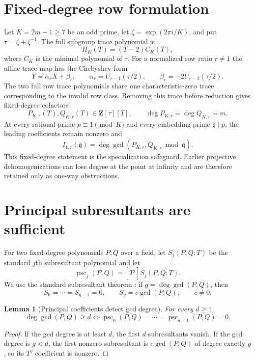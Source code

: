 \documentclass[11pt]{article}
\newtheorem{lemma}[theorem]{Lemma}
\begin{document}
\section{Fixed-degree row formulation}

Let $K=2m+1\ge7$ be an odd prime, let
$\zeta=\exp(2\pi i/K)$, and put $\tau=\zeta+\zeta^{-1}$.  The full subgroup
trace polynomial is
\[
H_K(T)=(T-2)C_K(T),
\]
where $C_K$ is the minimal polynomial of $\tau$.  For a normalized row ratio
$r\ne1$ the affine trace map has the Chebyshev form
\[
Y=\alpha_rX+\beta_r,
\qquad
\alpha_r=U_{r-1}(\tau/2),
\qquad
\beta_r=-2U_{r-2}(\tau/2).
\]
The two full row trace polynomials share one characteristic-zero trace
corresponding to the invalid row class.  Removing this trace before reduction
gives fixed-degree cofactors
\[
P_{K,r}(T),Q_{K,r}(T)\in\mathbf Z[\tau][T],
\qquad
\deg P_{K,r}=\deg Q_{K,r}=m.
\]
At every rational prime $p\equiv1\pmod K$ and every embedding prime
$\mathfrak q\mid p$, the leading coefficients remain nonzero and
\begin{equation}\label{eq:gcd-count}
I_{1,r}(\mathfrak q)
 =\deg\gcd(P_{K,r},Q_{K,r}\bmod\mathfrak q).
\end{equation}
This fixed-degree statement is the specialization safeguard.  Earlier
projective dehomogenizations can lose degree at the point at infinity and are
therefore retained only as one-way obstructions.

\section{Principal subresultants are sufficient}

For two fixed-degree polynomials $P,Q$ over a field, let $S_j(P,Q;T)$ be the
standard $j$th subresultant polynomial and let
\[
\operatorname{psc}_j(P,Q)=[T^j]S_j(P,Q;T).
\]
We use the standard subresultant theorem \cite{BrownTraub}: if
$g=\deg\gcd(P,Q)$, then
\[
S_0=\cdots=S_{g-1}=0,
\qquad
S_g=c\gcd(P,Q),\qquad c\ne0.
\]

\begin{lemma}[Principal coefficients detect gcd degree]\label{lem:psc}
For every $d\ge1$,
\[
\deg\gcd(P,Q)\ge d
\iff
\operatorname{psc}_0(P,Q)=\cdots=
\operatorname{psc}_{d-1}(P,Q)=0.
\]
\end{lemma}

\begin{proof}
If the gcd degree is at least $d$, the first $d$ subresultants vanish.  If the
gcd degree is $g<d$, the first nonzero subresultant is
$c\gcd(P,Q)$ of degree exactly $g$, so its $T^g$ coefficient is nonzero.
\end{proof}
\end{document}
